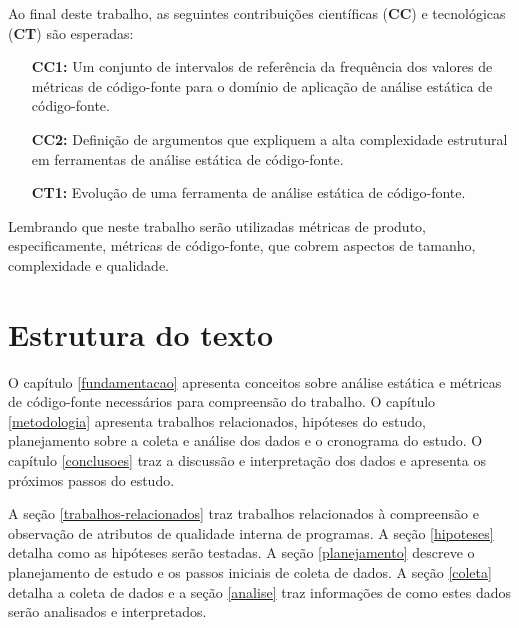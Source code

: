 Ao final deste trabalho, as seguintes contribuições científicas ({\bf CC}) e
tecnológicas ({\bf CT}) são esperadas:

\begin{enumerate}
  \item [{\bf CC1:}] Um conjunto de intervalos de referência da frequência dos
    valores de métricas de código-fonte para o domínio de aplicação de
    análise estática de código-fonte.
  \item [{\bf CC2:}] Definição de argumentos que expliquem a alta complexidade
    estrutural em ferramentas de análise estática de código-fonte.
  \item [{\bf CT1:}] Evolução de uma ferramenta de análise estática de
    código-fonte.
\end{enumerate}

Lembrando que neste trabalho serão utilizadas métricas de produto,
especificamente, métricas de código-fonte, que cobrem aspectos de tamanho,
complexidade e qualidade.

\section{Estrutura do texto} 

O capítulo \ref{fundamentacao} apresenta conceitos sobre análise estática e
métricas de código-fonte necessários para compreensão do trabalho. O capítulo
\ref{metodologia} apresenta trabalhos relacionados, hipóteses do estudo,
planejamento sobre a coleta e análise dos dados
e o cronograma do estudo. O capítulo \ref{conclusoes} traz a
discussão e interpretação dos dados e apresenta os próximos passos do estudo.

A seção \ref{trabalhos-relacionados} traz trabalhos relacionados à compreensão
e observação de atributos de qualidade interna de programas. A seção
\ref{hipoteses} detalha como as hipóteses serão testadas. A seção
\ref{planejamento} descreve o planejamento de estudo e os passos iniciais de
coleta de dados. A seção \ref{coleta} detalha a coleta de dados e a seção
\ref{analise} traz informações de como estes dados serão analisados e
interpretados.
